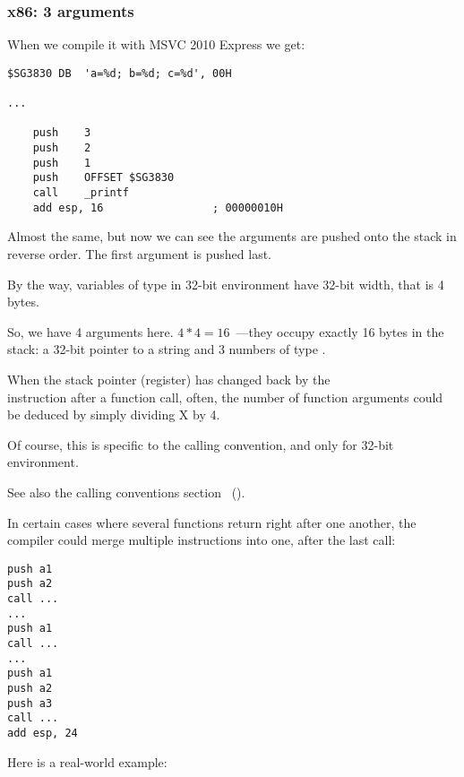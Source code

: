 \subsubsection{x86: 3 arguments}


When we compile it with MSVC 2010 Express we get:

\begin{lstlisting}[style=customasmx86]
$SG3830	DB	'a=%d; b=%d; c=%d', 00H

...

	push	3
	push	2
	push	1
	push	OFFSET $SG3830
	call	_printf
	add	esp, 16					; 00000010H
\end{lstlisting}

Almost the same, but now we can see the \printf arguments are pushed onto the stack in reverse order. The first argument is pushed last.

By the way, variables of \Tint type in 32-bit environment have 32-bit width, that is 4 bytes.

So, we have 4 arguments here. $4*4 = 16$~---they occupy exactly 16 bytes in the stack: a 32-bit pointer to a string and 3 numbers of type \Tint.

When the \gls{stack pointer} (\ESP register) has changed back by the\\
 instruction after a function call, often,
the number of function arguments could be deduced by simply dividing X by 4.

Of course, this is specific to the  calling convention, and only for 32-bit environment.

See also the calling conventions section ~().

In certain cases where several functions return right after one another, the compiler could merge multiple  instructions into one, after the last call:

\begin{lstlisting}[style=customasmx86]
push a1
push a2
call ...
...
push a1
call ...
...
push a1
push a2
push a3
call ...
add esp, 24
\end{lstlisting}

Here is a real-world example:



\clearpage
{}
\myindex{\olly}

